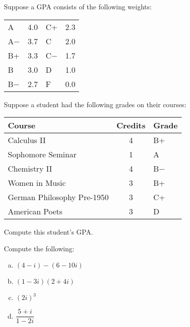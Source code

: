 \documentclass[11pt,letterpaper]{article}
\begin{document}
 Suppose a GPA consists of the following weights:
	\begin{table}[!ht]
	\centering
	\begin{tabular}{lr|lr}
	A & 4.0 & C+ & 2.3 \\
	A$-$ & 3.7 & C & 2.0 \\
	B+ & 3.3 & C$-$ & 1.7 \\
	B & 3.0 & D & 1.0 \\
	B$-$ & 2.7 & F & 0.0
	\end{tabular}
	\end{table} \par
Suppose a student had the following grades on their courses:
	\begin{table}[!ht]
	\centering
	\begin{tabular}{lcl}
	Course & Credits & Grade \\ \hline
	Calculus II & 4 & B+ \\
	Sophomore Seminar & 1 & A \\
	Chemistry II & 4 & B$-$ \\
	Women in Music & 3 & B+ \\
	German Philosophy Pre-1950 & 3 & C+ \\
	American Poets & 3 & D
	\end{tabular}
	\end{table}
Compute this student's GPA. 



\newpage



 Compute the following:
	\begin{enumerate}[(a)]
	\item $(4 - i) - (6 - 10i)$
	\item $(1 - 3i)(2 + 4i)$
	\item $(2i)^3$
	\item $\dfrac{5 + i}{1 - 2i}$
	\end{enumerate} 
\end{document}
